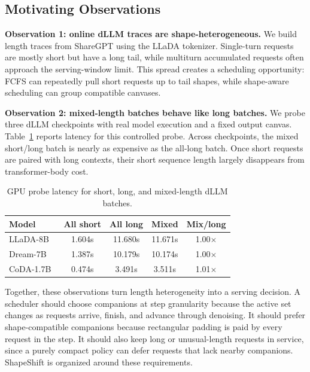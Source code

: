 \documentclass[letterpaper]{article} \usepackage[submission]{aaai2027} \usepackage[hyphens]{url} \usepackage{graphicx} \usepackage{subcaption} \urlstyle{rm} \def\UrlFont{\rm} \usepackage{natbib} \usepackage{amsmath} \usepackage{amssymb} \usepackage{booktabs} \usepackage{multirow} \usepackage{algorithm} \usepackage{algorithmic}
\begin{document}
\subsection{Motivating Observations}

\textbf{Observation 1: online dLLM traces are shape-heterogeneous.} We build length traces from ShareGPT using the LLaDA tokenizer. Single-turn requests are mostly short but have a long tail, while multiturn accumulated requests often approach the serving-window limit. This spread creates a scheduling opportunity: FCFS can repeatedly pull short requests up to tail shapes, while shape-aware scheduling can group compatible canvases.

\textbf{Observation 2: mixed-length batches behave like long batches.} We probe three dLLM checkpoints with real model execution and a fixed output canvas. Table~\ref{tab:motivation-probe} reports latency for this controlled probe. Across checkpoints, the mixed short/long batch is nearly as expensive as the all-long batch. Once short requests are paired with long contexts, their short sequence length largely disappears from transformer-body cost.

\begin{table}[t]
\centering
\scriptsize
\setlength{\tabcolsep}{2.8pt}
\begin{tabular}{lcccc}
\toprule
Model & All short & All long & Mixed & Mix/long \\
\midrule
LLaDA-8B~\cite{nie2025llada} & 1.604s & 11.680s & 11.671s & 1.00$\times$ \\
Dream-7B~\cite{dream2025} & 1.387s & 10.179s & 10.174s & 1.00$\times$ \\
CoDA-1.7B~\cite{coda2025} & 0.474s & 3.491s & 3.511s & 1.01$\times$ \\
\bottomrule
\end{tabular}
\caption{GPU probe latency for short, long, and mixed-length dLLM batches.}
\label{tab:motivation-probe}
\end{table}

Together, these observations turn length heterogeneity into a serving decision. A scheduler should choose companions at step granularity because the active set changes as requests arrive, finish, and advance through denoising. It should prefer shape-compatible companions because rectangular padding is paid by every request in the step. It should also keep long or unusual-length requests in service, since a purely compact policy can defer requests that lack nearby companions. ShapeShift is organized around these requirements.
\end{document}
